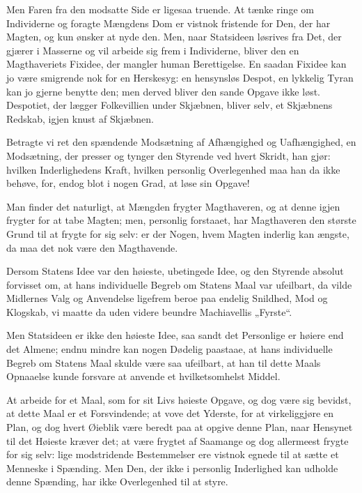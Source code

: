 \documentclass[12pt,a4paper]{book}
\newcommand{\apage}[1]{\marginnote{\footnotesize\textit{[#1]}}}
\begin{document}
Men Faren fra den modsatte Side er ligesaa truende. At tænke ringe
om Individerne og foragte Mængdens Dom er vistnok fristende for Den,
der har Magten, og kun ønsker at nyde den. Men, naar Statsideen
løsrives fra Det, der
gjærer i Masserne og vil arbeide sig frem i Individerne, \apage{64} bliver den
en Magthaveriets Fixidee, der mangler human Berettigelse. En saadan
Fixidee kan jo være smigrende nok for en Herskesyg: en hensynsløs
Despot, en lykkelig Tyran kan jo gjerne benytte den; men derved
bliver den sande Opgave ikke løst. Despotiet, der lægger Folkevillien
under Skjæbnen, bliver selv, et Skjæbnens Redskab, igjen knust af
Skjæbnen.

Betragte vi ret den spændende Modsætning af Afhængighed og
Uafhængighed, en Modsætning, der presser og tynger den Styrende ved
hvert Skridt, han gjør: hvilken Inderlighedens Kraft, hvilken
personlig Overlegenhed maa han da ikke behøve, for, endog blot i
nogen Grad, at løse sin Opgave!

Man finder det naturligt, at Mængden frygter Magthaveren, og at
denne igjen frygter for at tabe Magten; men, personlig forstaaet, har
Magthaveren den største Grund til at frygte for sig selv: er der
Nogen, hvem Magten inderlig kan ængste, da maa det nok være den
Magthavende.

Dersom Statens Idee var den høieste, ubetingede Idee, og den
Styrende absolut forvisset om, at hans individuelle Begreb om
Statens Maal var ufeilbart, da vilde Midlernes Valg og Anvendelse
ligefrem beroe paa endelig Snildhed, Mod og Klogskab, vi maatte da
uden videre beundre Machiavellis „Fyrste“.

Men Statsideen er ikke den høieste Idee, saa sandt det Personlige er
høiere end det Almene; endnu mindre kan nogen Dødelig paastaae, at
hans individuelle Begreb om Statens Maal skulde være saa ufeilbart,
at han til dette Maals Opnaaelse kunde forsvare at anvende et
hvilketsomhelst Middel.

At arbeide for et Maal, som for sit Livs høieste Opgave, og dog være
sig bevidst, at dette Maal er et Forsvindende; at vove det Yderste,
for at virkeliggjøre en Plan, og dog hvert Øieblik være beredt paa at
opgive denne \apage{65} Plan, naar
Hensynet til det Høieste kræver det; at være frygtet af Saamange og
dog allermeest frygte for sig selv: lige modstridende Bestemmelser
ere vistnok egnede til at sætte et Menneske i Spænding. Men Den, der
ikke i personlig Inderlighed kan udholde denne Spænding, har ikke
Overlegenhed til at styre.
\end{document}
